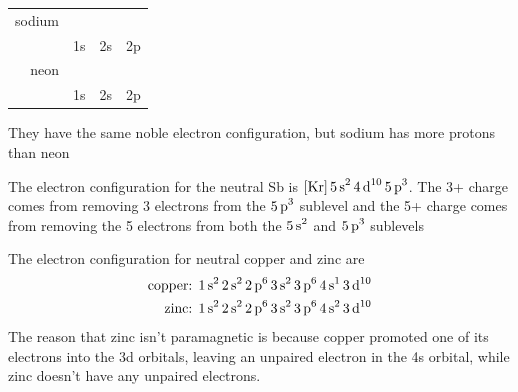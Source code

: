 \begin{solutions}
    \item 
        \begin{enum-alph}
            \item \invis
                \begin{table}[ht]
                    \centering
                    \setlength{\tabcolsep}{12pt}      %
                    \renewcommand{\arraystretch}{1.2} %
                    \begin{tabular}{r c c c}
                        sodium & \electron{}{\updwn} & \electron{}{\updwn} & \electron{}{\updwn\updwn\updwn}\\
                               & 1s & 2s & 2p \\
                        neon & \electron{}{\updwn} & \electron{}{\updwn} & \electron{}{\updwn\updwn\updwn} \\
                               & 1s & 2s & 2p
                    \end{tabular}
                \end{table}
            \item They have the same noble electron configuration, but sodium has more protons
                than neon
        \end{enum-alph}
    \item The electron configuration for the neutral Sb is $\ch{[Kr] 5s^2 4d^10 5p^3}$. The 3+
        charge comes from removing 3 electrons from the $\ch{5p^3}$ sublevel and the 5+ charge
        comes from removing the 5 electrons from both the $\ch{5s^2}$ and $\ch{5p^3}$ sublevels
    \item The electron configuration for neutral copper and zinc are
        \begin{align*}
            \text{copper: }&\ch{1s^2 2s^2 2p^6 3s^2 3p^6 4s^1 3d^10}\\
            \text{zinc: }&\ch{1s^2 2s^2 2p^6 3s^2 3p^6 4s^2 3d^10}
        \end{align*}
        The reason that zinc isn't paramagnetic is because copper promoted one of its electrons
        into the 3d orbitals, leaving an unpaired electron in the 4s orbital, while zinc doesn't 
        have any unpaired electrons.
\end{solutions}

